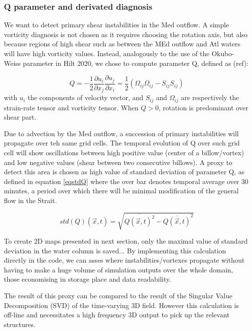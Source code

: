 \subsubsection{Q parameter and derivated diagnosis}

We want to detect primary shear instabilities in the Med outflow. A simple vorticity diagnosis is not chosen as it requires choosing the rotation axis, but also because regions of high shear such as between the MEd outflow and Atl waters will have high vorticity values. Instead, analogously to the use of the Okubo-Weiss parameter in Hilt 2020, we chose to compute parameter Q, defined as (ref):

\begin{equation}
Q=-\frac{1}{2} \frac{\partial u_i}{\partial x_j} \frac{\partial u_j}{\partial x_i} = \frac{1}{2} (\Omega_{ij}\Omega_{ij} - S_{ij} S_{ij})
\end{equation}
with $u_i$ the components of velocity vector, and $S_{ij}$ and $\Omega_{ij}$ are respectively the strain-rate tensor and vorticity tensor. When $Q>0$, rotation is predominant over shear part.


Due to advection by the Med outflow, a succession of primary instabilities will propagate over teh same grid cells. The temporal evolution of Q over such grid cell will show oscillations between high positive value (center of a billow/vortex) and low negative values (shear between two consecutive billows). A proxy to detect this area is chosen as high value of standard deviation of parameter Q, as defined in equation \ref{eqstdQ} where the over bar denotes temporal average over 30 minutes, a period over which there will be minimal modification of the general flow in the Strait.

\begin{equation} 
\label{eqstdQ} 
    std ( Q ) (\vec{x},t)=  \sqrt{   \overline{Q (\vec{x},t)^{2}} -  \overline{Q(\vec{x},t)}^{2}  }
\end{equation}

To create 2D maps presented in next section, only the maximal value of standard deviation in the water column is saved...
By implementing this calculation directly in the code, we can asses where instabilities/vortexes propagate without having to make a huge volume of simulation outputs over the whole domain, those economising in storage place and data readability. 

The result of this proxy can be compared to the result of the Singular Value Decomposition (SVD) of the time-varying 3D field. However this calculation is off-line and necessitates a high frequency 3D output to pick up the relevant structures.



